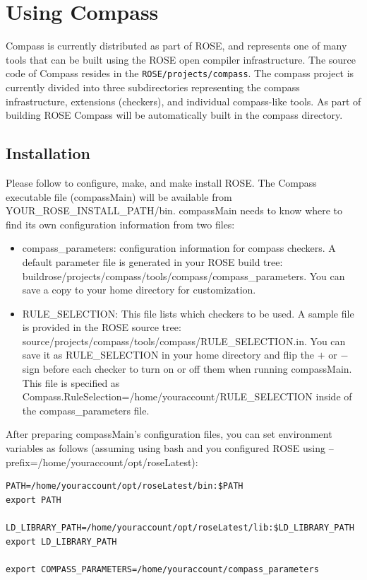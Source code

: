 \chapter{Using Compass}
Compass is currently distributed as part of ROSE, and represents one
of many tools that can be built using the ROSE open compiler infrastructure.
The source code of Compass resides in the {\tt ROSE/projects/compass}.
The compass project is currently divided into three subdirectories representing
the compass infrastructure, extensions (checkers), and individual compass-like
tools. As part of building ROSE Compass will be automatically built in the 
compass directory. 

\section{Installation}
\label{usingCompassInstallation}
Please follow
 to
configure, make, and make install ROSE. The Compass executable file
(compassMain) will be available from YOUR\_ROSE\_INSTALL\_PATH/bin. compassMain needs to know where to find its own configuration information from two
files:
\begin{itemize}
\item compass\_parameters: configuration information for compass checkers.
A default parameter file is generated in your ROSE build tree:
buildrose/projects/compass/tools/compass/compass\_parameters. You can
save a copy to your home directory for customization. 
\item RULE\_SELECTION: This file lists which checkers to be used. A sample
file is provided in the ROSE source tree:
source/projects/compass/tools/compass/RULE\_SELECTION.in. You can save
it as RULE\_SELECTION in your home directory and flip the $+$ or $-$ sign
before each checker to turn on or off them when running compassMain. This
file is specified as Compass.RuleSelection=/home/youraccount/RULE\_SELECTION
inside of the compass\_parameters file.
\end{itemize}

After preparing compassMain's configuration files, you can set environment variables as follows (assuming using bash
and you configured ROSE using --prefix=/home/youraccount/opt/roseLatest):

\begin{verbatim}
PATH=/home/youraccount/opt/roseLatest/bin:$PATH
export PATH

LD_LIBRARY_PATH=/home/youraccount/opt/roseLatest/lib:$LD_LIBRARY_PATH
export LD_LIBRARY_PATH

export COMPASS_PARAMETERS=/home/youraccount/compass_parameters
\end{verbatim}


